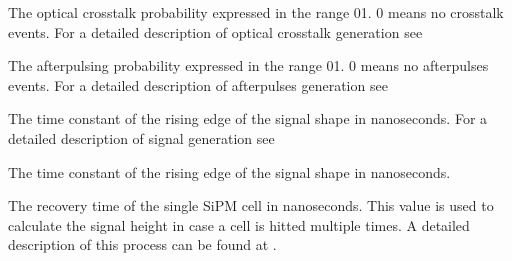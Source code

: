 \documentclass[letterpaper,10pt,english]{sphinxmanual}
\begin{document}
\begin{fulllineitems}
The optical crosstalk probability expressed in the range 0\sphinxhyphen{}1. 0 means no crosstalk events. For a detailed description of optical crosstalk generation see {\hyperref[\detokenize{theory:xttheory}]{}}

\end{fulllineitems}



\begin{fulllineitems}
The afterpulsing probability expressed in the range 0\sphinxhyphen{}1. 0 means no afterpulses events. For a detailed description of afterpulses generation see {\hyperref[\detokenize{theory:aptheory}]{}}

\end{fulllineitems}



\begin{fulllineitems}
The time constant of the rising edge of the signal shape in nanoseconds. For a detailed description of signal generation see {\hyperref[\detokenize{theory:sigshapingtheory}]{}}

\end{fulllineitems}



\begin{fulllineitems}
The time constant of the rising edge of the signal shape in nanoseconds.

\end{fulllineitems}



\begin{fulllineitems}
The recovery time of the single SiPM cell in nanoseconds. This value is used to calculate the signal height in case a cell is hitted multiple times. A detailed description of this process can be found at {\hyperref[\detokenize{theory:cellrecoverytheory}]{}}.

\end{fulllineitems}
\end{document}
